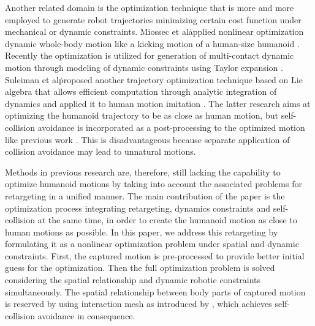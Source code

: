 \documentclass[letterpaper, 10 pt, conference]{ieeeconf}  %
\begin{document}
Another related domain is the optimization technique that is more and
more employed to generate robot trajectories minimizing certain cost
function under mechanical or dynamic constraints. Miossec et
al\. applied nonlinear optimization dynamic whole-body motion like a
kicking motion of a human-size humanoid \cite{Miossec06ROBIO}.
Recently the optimization is utilized for generation of multi-contact
dynamic motion through modeling of dynamic constraints using Taylor
expansion \cite{Lengagne13IJRR}. Suleiman et al\. proposed another
trajectory optimization technique based on Lie algebra that allows
efficient computation through analytic integration of dynamics
\cite{Suleiman07Humanoids} and applied it to human motion imitation
\cite{Suleiman08ICRA}.  The latter research aims at optimizing the
humanoid trajectory to be as close as human motion, but self-collision
avoidance is incorporated as a post-processing to the optimized motion
like previous work \cite{Nakaoka12Humanoids}. This is disadvantageous
because separate application of collision avoidance may lead to
unnatural motions.



Methods in previous research are, therefore, still lacking the
capability to optimize humanoid motions by taking into account
the associated problems for retargeting in a unified manner.
The main contribution of the paper is the optimization process
integrating retargeting, dynamics constraints and self-collision at
the same time, 
in order to create the humanoid motion as close to human motions as
possible. 
In this paper, we address this retargeting by formulating it
as a nonlinear optimization problem under spatial and dynamic
constraints.
First, the captured motion is pre-processed to provide better initial
guess for the optimization.
Then the full optimization problem is solved
considering the spatial relationship and dynamic robotic constraints
simultaneously.  
The spatial relationship between body parts of captured motion is
reserved by using interaction mesh as introduced by \cite{Komura10},
which achieves self-collision avoidance in consequence. 
\end{document}
